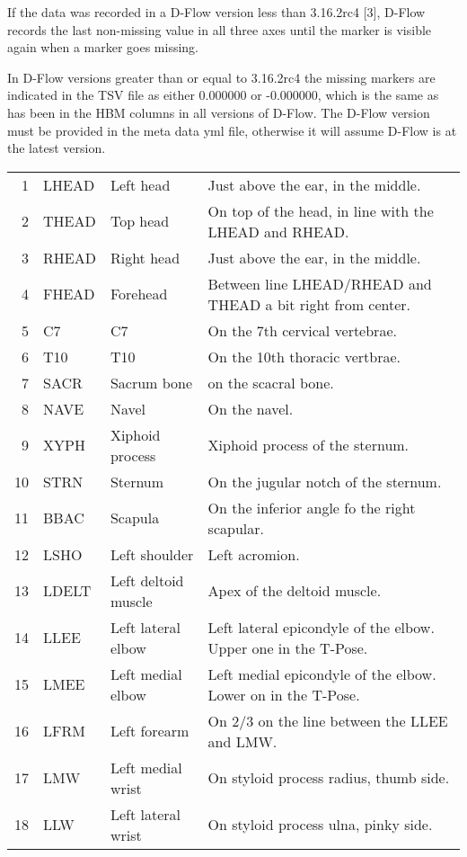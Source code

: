 \documentclass{article}
\begin{document}
If the data was recorded in a D-Flow version less than 3.16.2rc4 [3], D-Flow
records the last non-missing value in all three axes until the marker is
visible again when a marker goes missing.

In D-Flow versions greater than or equal to 3.16.2rc4 the missing markers are
indicated in the TSV file as either 0.000000 or -0.000000, which is the same as
has been in the HBM columns in all versions of D-Flow. The D-Flow version must
be provided in the meta data yml file, otherwise it will assume D-Flow is at
the latest version.

\begin{table}
  \begin{tabular}{rlll}
    1 & LHEAD & Left head & Just above the ear, in the middle. \\
    2 & THEAD & Top head & On top of the head, in line with the LHEAD and RHEAD. \\
    3 & RHEAD & Right head & Just above the ear, in the middle. \\
    4 & FHEAD & Forehead & Between line LHEAD/RHEAD and THEAD a bit right from center. \\
    5 & C7 & C7 & On the 7th cervical vertebrae. \\
    6 & T10 & T10 & On the 10th thoracic vertbrae. \\
    7 & SACR & Sacrum bone & on the scacral bone. \\
    8 & NAVE & Navel & On the navel. \\
    9 & XYPH & Xiphoid process & Xiphoid process of the sternum. \\
    10 & STRN & Sternum & On the jugular notch of the sternum. \\
    11 & BBAC & Scapula & On the inferior angle fo the right scapular. \\
    12 & LSHO & Left shoulder & Left acromion. \\
    13 & LDELT & Left deltoid muscle & Apex of the deltoid muscle. \\
    14 & LLEE & Left lateral elbow & Left lateral epicondyle of the elbow. Upper one in the T-Pose. \\
    15 & LMEE & Left medial elbow & Left medial epicondyle of the elbow. Lower on in the T-Pose. \\
    16 & LFRM & Left forearm & On 2/3 on the line between the LLEE and LMW. \\
    17 & LMW & Left medial wrist & On styloid process radius, thumb side. \\
    18 & LLW & Left lateral wrist & On styloid process ulna, pinky side. \\

\end{tabular}
\end{table}
\end{document}

